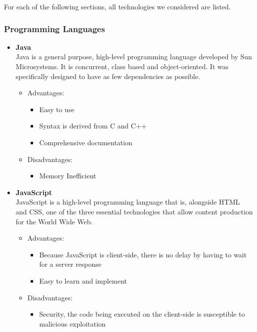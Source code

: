 \documentclass{article}
\begin{document}
	For each of the following sections, all technologies we considered are listed.
	
	\subsubsection{Programming Languages}
		\begin{itemize}
			\item\textbf{Java}\\
			Java is a general purpose, high-level programming language developed by Sun Microsystems. It is concurrent, class based and object-oriented. It was specifically designed to have as few dependencies as possible.
				
				\begin{itemize}			
					\item Advantages:
						\begin{itemize}
							\item Easy to use
							\item Syntax is derived from C and C++
							\item Comprehensive documentation
						\end{itemize}
						
					\item Disadvantages:
						\begin{itemize}
							\item Memory Inefficient
						\end{itemize}
				\end{itemize}
				
			\item\textbf{JavaScript} \\
			
			JavaScript is a high-level programming language that is, alongside HTML and CSS, one of the three essential technologies that allow content production for the World Wide Web.
				
				\begin{itemize}
					\item Advantages:
						\begin{itemize}
							\item  Because JavaScript is client-side, there is no delay by having to wait for a server response
							\item Easy to learn and implement
						\end{itemize}
						
					\item Disadvantages:
						\begin{itemize}
							\item Security, the code being executed on the client-side is susceptible to malicious exploitation
						\end{itemize}
				\end{itemize}
				

\end{itemize}
\end{document}
